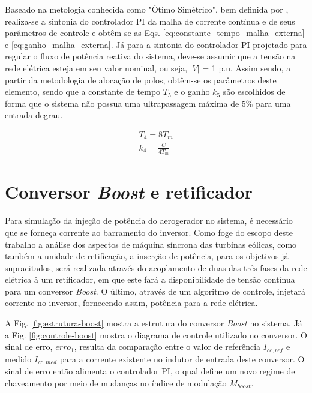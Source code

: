 Baseado na metologia conhecida como "Ótimo Simétrico", bem definida por \cite{ArticleRezek}, realiza-se a sintonia do controlador PI da malha de corrente contínua e de seus parâmetros de controle e obtêm-se as Eqs. \ref{eq:constante_tempo_malha_externa} e \ref{eq:ganho_malha_externa}. Já para a sintonia do controlador PI projetado para regular o fluxo de potência reativa do sistema, deve-se assumir que a tensão na rede elétrica esteja em seu valor nominal, ou seja, $|V|$ = 1 p.u. Assim sendo, a partir da metodologia de alocação de polos, obtêm-se os parâmetros deste elemento, sendo que a constante de tempo $T_5$ e o ganho $k_5$ são escolhidos de forma que o sistema não possua uma ultrapassagem máxima de 5\% para uma entrada degrau.

\begin{align}
	T_4 = 8T_m\label{eq:constante_tempo_malha_externa}\\
	k_4 = \frac{C}{4T_m}\label{eq:ganho_malha_externa}
\end{align}

\section{Conversor \textit{Boost} e retificador}

Para simulação da injeção de potência do aerogerador no sistema, é necessário que se forneça 
corrente ao barramento do inversor. Como foge do escopo deste trabalho a análise dos aspectos 
de máquina síncrona das turbinas eólicas, como também a unidade de retificação, 
a inserção de potência, para os objetivos já supracitados, será realizada através do 
acoplamento de duas das três fases da rede elétrica à um retificador, em que este fará a 
disponibilidade de tensão contínua para um conversor \textit{Boost}. O último, através de 
um algoritmo de controle, injetará corrente no inversor, fornecendo assim, 
potência para a rede elétrica. 

A Fig. \ref{fig:estrutura-boost} mostra a estrutura do conversor \textit{Boost} no sistema.
Já a Fig. \ref{fig:controle-boost} mostra o diagrama de controle utilizado no conversor.
O sinal de erro, $erro_1$, resulta da comparação entre o valor de referência $I_{cc,ref}$ 
e medido $I_{cc,med}$ para a corrente existente no indutor de entrada deste conversor. 
O sinal de erro então alimenta o controlador PI, o qual define um novo regime de chaveamento 
por meio de mudanças no índice de modulação $M_{boost}$.

